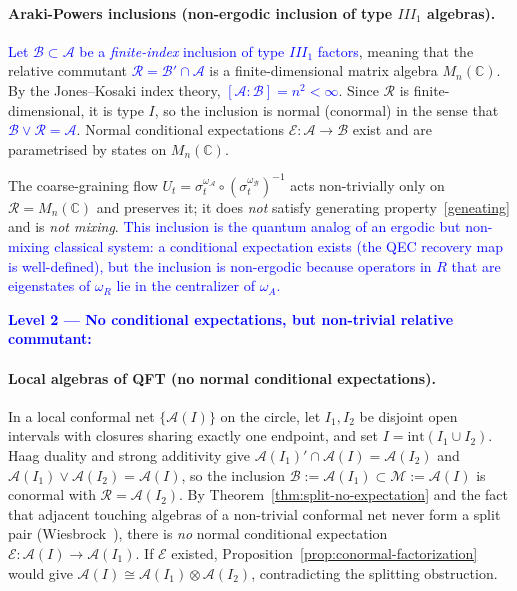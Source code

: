 \documentclass[a4paper,11pt]{article}
\theoremstyle{definition}
\theoremstyle{remark}
\newcommand{\mA}{\mathcal{A}}
\newcommand{\mB}{\mathcal{B}}
\newcommand{\mE}{\mathcal{E}}
\begin{document}
\paragraph{Araki-Powers inclusions (non-ergodic inclusion of type $III_1$ algebras).}
\textcolor{blue}{Let $\mB\subset\mA$ be a \emph{finite-index} inclusion of type $III_1$ factors},
meaning that the relative commutant \textcolor{blue}{$\mathcal{R}=\mB'\cap\mA$}
is a finite-dimensional matrix algebra $M_n(\mathbb{C})$.  By the Jones--Kosaki index
theory, \textcolor{blue}{$[\mathcal{A}:\mathcal{B}]=n^2<\infty$}.  Since $\mathcal{R}$
is finite-dimensional, it is type $I$, so the inclusion is normal (conormal) in the
sense that \textcolor{blue}{$\mathcal{B}\vee\mathcal{R}=\mathcal{A}$}.
Normal conditional expectations $\mE:\mA\to \mB$ exist and are parametrised by states
on $M_n(\mathbb{C})$.
 
The coarse-graining flow $U_t=\sigma_t^{\omega_\mathcal{A}}\circ(\sigma_t^{\omega_\mathcal{B}})^{-1}$
acts non-trivially only on $\mathcal{R}=M_n(\mathbb{C})$ and preserves it; it does
\emph{not} satisfy generating property~\eqref{geneating} and is \emph{not mixing}.
\textcolor{blue}{This inclusion is the quantum analog of an ergodic but non-mixing classical system: a
conditional expectation exists (the QEC recovery map is well-defined), but the
inclusion is non-ergodic because operators in $R$ that are eigenstates of $\omega_R$
lie in the centralizer of $\omega_A$.}
 
\textcolor{blue}{\medskip
\noindent\textbf{Level 2 — No conditional expectations, but non-trivial relative commutant:}}
 
\paragraph{Local algebras of QFT (no normal conditional expectations).}
In a local conformal net $\{\mathcal{A}(I)\}$ on the circle, let $I_1,I_2$ be disjoint
open intervals with closures sharing exactly one endpoint, and set
$I=\mathrm{int}(I_1\cup I_2)$.  Haag duality and strong additivity give
$\mathcal{A}(I_1)'\cap\mathcal{A}(I)=\mathcal{A}(I_2)$ and
$\mathcal{A}(I_1)\vee\mathcal{A}(I_2)=\mathcal{A}(I)$, so the inclusion
$\mathcal{B}:=\mathcal{A}(I_1)\subset\mathcal{M}:=\mathcal{A}(I)$ is conormal with
$\mathcal{R}=\mathcal{A}(I_2)$.  By Theorem~\ref{thm:split-no-expectation} and the fact
that adjacent touching algebras of a non-trivial conformal net never form a split pair
(Wiesbrock~\cite{Wiesbrock1993}), there is \emph{no} normal conditional expectation
$\mE:\mathcal{A}(I)\to\mathcal{A}(I_1)$.  If $\mE$ existed,
Proposition~\ref{prop:conormal-factorization} would give
$\mathcal{A}(I)\cong\mathcal{A}(I_1)\otimes\mathcal{A}(I_2)$, contradicting the
splitting obstruction.
 
\end{document}
